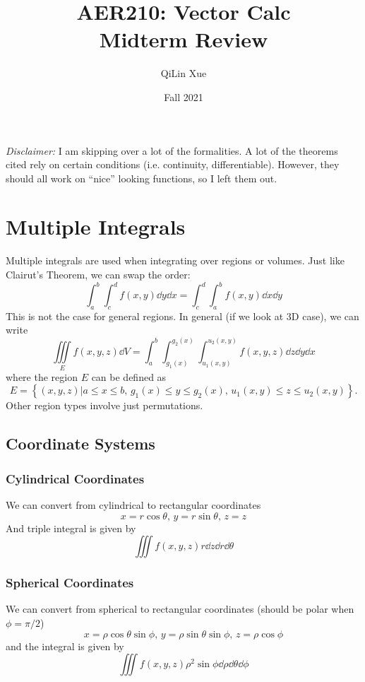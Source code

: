 \documentclass{article}
\title{AER210: Vector Calc \\ Midterm Review}
\author{QiLin Xue}
\date{Fall 2021}
\begin{document}
\maketitle
\textit{Disclaimer:} I am skipping over a lot of the formalities. A lot of the theorems cited rely on certain conditions (i.e. continuity, differentiable). However, they should all work on ``nice'' looking functions, so I left them out.
\section{Multiple Integrals}
Multiple integrals are used when integrating over regions or volumes. Just like Clairut's Theorem, we can swap the order:
\begin{equation}
    \int_a^b\int_c^d f(x,y) \dd{y}\dd{x} = \int_c^d\int_a^b f(x,y)\dd{x}\dd{y}
\end{equation}
This is not the case for general regions. In general (if we look at 3D case), we can write
\begin{equation}
    \iiint\limits_{E} f(x,y,z)\dd{V} = \int_a^b\int_{g_1(x)}^{g_2(x)}\int_{u_1(x,y)}^{u_2(x,y)} f(x,y,z) \dd{z}\dd{y}\dd{x}
\end{equation}
where the region $E$ can be defined as
\begin{equation}
    E = \left\{(x,y,z) |a \le x \le b,\, g_1(x) \le y \le g_2(x),\, u_1(x,y) \le z \le u_2(x,y)\right\}.
\end{equation}
Other region types involve just permutations.
\subsection{Coordinate Systems}
\subsubsection*{Cylindrical Coordinates}
We can convert from cylindrical to rectangular coordinates
\begin{equation}
    x = r\cos\theta,\, y=r\sin\theta,\, z=z
\end{equation}
And triple integral is given by
\begin{equation}
    \iiint f(x,y,z)r\dd{z}\dd{r}\dd\theta
\end{equation}
\subsubsection*{Spherical Coordinates}
We can convert from spherical to rectangular coordinates (should be polar when $\phi=\pi/2$)
\begin{equation}
    x=\rho \cos\theta\sin\phi,\, y=\rho\sin\theta\sin\phi,\, z=\rho\cos\phi
\end{equation}
and the integral is given by
\begin{equation}
    \iiint f(x,y,z) \rho^2 \sin\phi \dd{\rho}\dd{\theta}\dd{\phi}
\end{equation}
\end{document}
